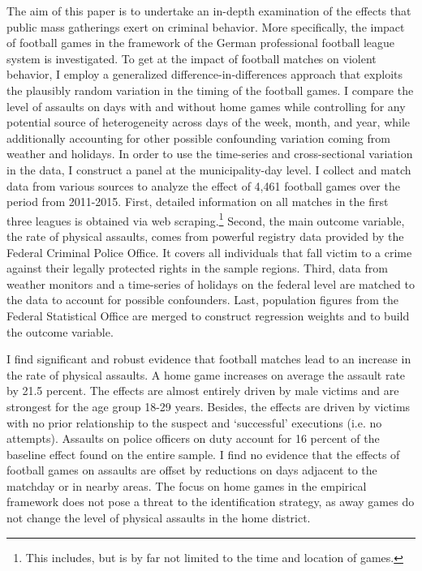 The aim of this paper is to undertake an in-depth examination of the effects that public mass gatherings exert on criminal behavior. More specifically, the impact of football games in the framework of the German professional football league system is investigated. To get at the impact of football matches on violent behavior, I employ a generalized difference-in-differences approach that exploits the plausibly random variation in the timing of the football games. I compare the level of assaults on days with and without home games while controlling for any potential source of heterogeneity across days of the week, month, and year, while additionally accounting for other possible confounding variation coming from weather and holidays. In order to use the time-series and cross-sectional variation in the data, I construct a panel at the municipality-day level. I collect and match data from various sources to analyze the effect of 4,461 football games over the period from 2011-2015. First, detailed information on all matches in the first three leagues is obtained via web scraping.\footnote{This includes, but is by far not limited to the time and location of games.} Second, the main outcome variable, the rate of physical assaults, comes from powerful registry data provided by the Federal Criminal Police Office. It covers all individuals that fall victim to a crime against their legally protected rights in the sample regions. Third, data from weather monitors and a time-series of holidays on the federal level are matched to the data to account for possible confounders. Last, population figures from the Federal Statistical Office are merged to construct regression weights and to build the outcome variable. 



I find significant and robust evidence that football matches lead to an increase in the rate of physical assaults. A home game increases on average the assault rate by 21.5 percent. The effects are almost entirely driven by male victims and are strongest for the age group 18-29 years. Besides, the effects are driven by victims with no prior relationship to the suspect and `successful' executions (i.e. no attempts). Assaults on police officers on duty account for 16 percent of the baseline effect found on the entire sample. I find no evidence that the effects of football games on assaults are offset by reductions on days adjacent to the matchday or in nearby areas. The focus on home games in the empirical framework does not pose a threat to the identification strategy, as away games do not change the level of physical assaults in the home district.



